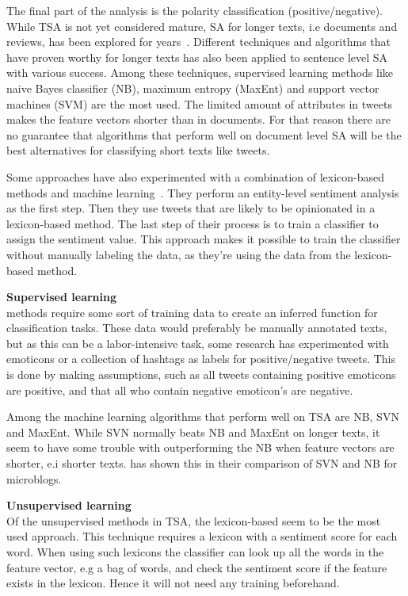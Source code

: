 The final part of the analysis is the polarity classification (positive/negative). While TSA is not yet considered mature, SA for longer texts, i.e documents and reviews, has been explored for years~\citep{book:pang}. Different techniques and algorithms that have proven worthy for longer texts has also been applied to sentence level SA with various success. Among these techniques, supervised learning methods like naive Bayes classifier (NB), maximum entropy (MaxEnt) and support vector machines (SVM) are the most used. The limited amount of attributes in tweets makes the feature vectors shorter than in documents. For that reason there are no guarantee that algorithms that perform well on document level SA will be the best alternatives for classifying short texts like tweets.

Some approaches have also experimented with a combination of lexicon-based methods and  machine learning~\citep{article:mudinas}. They perform an entity-level sentiment analysis as the first step. Then they use tweets that are likely to be opinionated in a lexicon-based method. The last step of their process is to train a classifier to assign the sentiment value. This approach makes it possible to train the classifier without manually labeling the data, as they’re using the data from the lexicon-based method.\vspace{8mm}

\noindent
\textbf{Supervised learning} \\
\noindent
methods require some sort of training data to create an inferred function for classification tasks. These data would preferably be manually annotated texts, but as this can be a labor-intensive task, some research has experimented with emoticons or a collection of hashtags as labels for positive/negative tweets. This is done by making assumptions, such as all tweets containing positive emoticons are positive, and that all who contain negative emoticon’s are negative.

Among the machine learning algorithms that perform well on TSA are NB, SVN and MaxEnt. While SVN normally beats NB and MaxEnt on longer texts, it seem to have some trouble with outperforming the NB when feature vectors are shorter, e.i shorter texts. \cite{article:bermingham} has shown this in their comparison of SVN and NB for microblogs.\vspace{8 mm}

\noindent
\textbf{Unsupervised learning} \\
\noindent Of the unsupervised methods in TSA, the lexicon-based seem to be the most used approach. This technique requires a lexicon with a sentiment score for each word. When using such lexicons the classifier can look up all the words in the feature vector, e.g a bag of words, and check the sentiment score if the feature exists in the lexicon. Hence it will not need any training beforehand.
	

